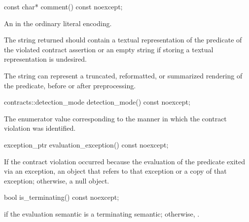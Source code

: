\begin{itemdecl}
const char* comment() const noexcept;
\end{itemdecl}

\begin{itemdescr}
\pnum
\returns
An
\ntmbs{} in
the ordinary literal encoding.

\pnum
\recommended
The string returned
should contain a textual representation
of the predicate of the violated contract assertion
or an empty string if
storing a textual representation is undesired.
\begin{note}
The string can represent a
truncated, reformatted, or summarized rendering of the
predicate, before or after preprocessing.
\end{note}

\end{itemdescr}

\begin{itemdecl}
contracts::detection_mode detection_mode() const noexcept;
\end{itemdecl}

\begin{itemdescr}
\pnum
\returns
The enumerator value
corresponding to
the manner in which the contract violation was identified.

\end{itemdescr}

\begin{itemdecl}
exception_ptr evaluation_exception() const noexcept;
\end{itemdecl}

\begin{itemdescr}

\pnum
\returns
If the contract violation occurred
because the evaluation of the predicate exited via an exception,
an  object that refers to
that exception or a copy of that exception;
otherwise, a null  object.

\end{itemdescr}

\begin{itemdecl}
bool is_terminating() const noexcept;
\end{itemdecl}

\begin{itemdescr}
%
\pnum
\returns
{} if the evaluation semantic is
a terminating semantic;
otherwise, .

\end{itemdescr}

